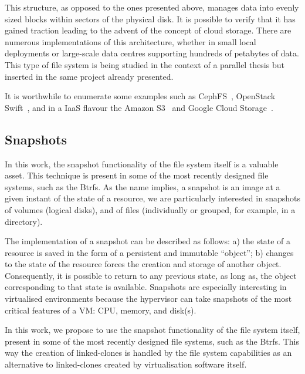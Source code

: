 This structure, as opposed to the ones presented above, manages data into evenly sized blocks within sectors of the physical disk. It is possible to verify that it has gained traction leading to the advent of the concept of cloud storage. There are numerous implementations of this architecture, whether in small local deployments or large-scale data centres supporting hundreds of petabytes of data.
This type of file system is being studied in the context of a parallel thesis but inserted in the same project already presented.

It is worthwhile to enumerate some examples such as CephFS~\cite{Weil2006}, OpenStack Swift~\cite{Swift2017}, and in a IaaS flavour the Amazon S3~\cite{aws_s3} and Google Cloud Storage~\cite{gcp_storage}.


\subsection{Snapshots} %
\label{sub:res_snapshots}

In this work, the snapshot functionality of the file system itself is a valuable asset. This technique is present in some of the most recently designed file systems, such as the Btrfs. 
As the name implies, a snapshot is an image at a given instant of the state of a resource,  we are particularly interested in snapshots of volumes (logical disks), and of files (individually or grouped, for example, in a directory).

The implementation of a snapshot can be described as follows: a) the state of a resource is saved in the form of a persistent and immutable ``object''; b) changes to the state of the resource forces the creation and storage of another object. Consequently, it is possible to return to any previous state, as long as, the object corresponding to that state is available. Snapshots are especially interesting in virtualised environments because the hypervisor can take snapshots of the most critical features of a VM: CPU, memory, and disk(s). 

In this work, we propose to use the snapshot functionality of the file system itself, present in some of the most recently designed file systems, such as the Btrfs. This way the creation of linked-clones is handled by the file system capabilities as an alternative to linked-clones created by virtualisation software itself.

